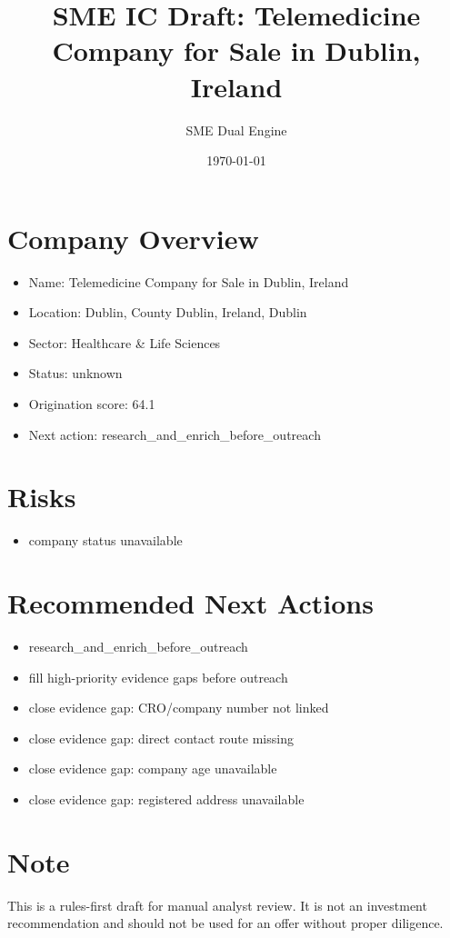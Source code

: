 \documentclass[11pt,a4paper]{article}
\title{SME IC Draft: Telemedicine Company for Sale in Dublin, Ireland}
\author{SME Dual Engine}
\date{\today}
\begin{document}
\maketitle
\section*{Company Overview}
\begin{itemize}[leftmargin=1.4em]
\item Name: Telemedicine Company for Sale in Dublin, Ireland
\item Location: Dublin, County Dublin, Ireland, Dublin
\item Sector: Healthcare \& Life Sciences
\item Status: unknown
\item Origination score: 64.1
\item Next action: research\_and\_enrich\_before\_outreach
\end{itemize}
\section*{Risks}
\begin{itemize}[leftmargin=1.4em]
\item company status unavailable
\end{itemize}
\section*{Recommended Next Actions}
\begin{itemize}[leftmargin=1.4em]
\item research\_and\_enrich\_before\_outreach
\item fill high-priority evidence gaps before outreach
\item close evidence gap: CRO/company number not linked
\item close evidence gap: direct contact route missing
\item close evidence gap: company age unavailable
\item close evidence gap: registered address unavailable
\end{itemize}
\section*{Note}
This is a rules-first draft for manual analyst review. It is not an investment
recommendation and should not be used for an offer without proper diligence.
\end{document}
